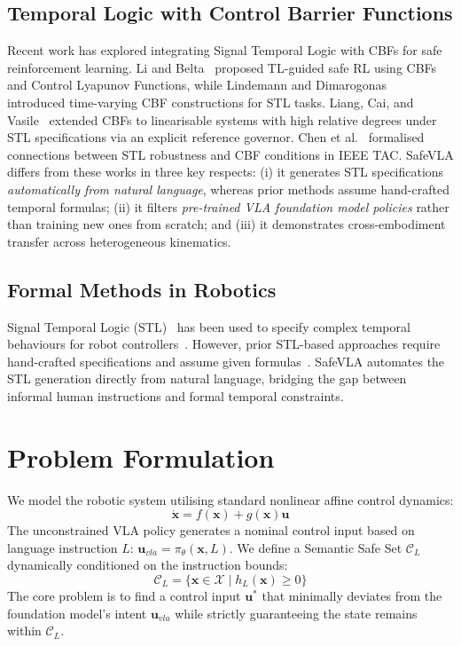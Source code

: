 \documentclass[conference]{IEEEtran}
\begin{document}
\subsection{Temporal Logic with Control Barrier Functions}
Recent work has explored integrating Signal Temporal Logic with CBFs for safe reinforcement learning. Li and Belta~\cite{li2022tl_cbf} proposed TL-guided safe RL using CBFs and Control Lyapunov Functions, while Lindemann and Dimarogonas~\cite{lindemann2018cbf_stl, lindemann2019cbf_stl_csl} introduced time-varying CBF constructions for STL tasks. Liang, Cai, and Vasile~\cite{liang2023erg_cbf_stl} extended CBFs to linearisable systems with high relative degrees under STL specifications via an explicit reference governor. Chen et al.~\cite{chen2025stl_cbf_tac} formalised connections between STL robustness and CBF conditions in IEEE TAC. SafeVLA differs from these works in three key respects: (i) it generates STL specifications \textit{automatically from natural language}, whereas prior methods assume hand-crafted temporal formulas; (ii) it filters \textit{pre-trained VLA foundation model policies} rather than training new ones from scratch; and (iii) it demonstrates cross-embodiment transfer across heterogeneous kinematics.
\subsection{Formal Methods in Robotics}
Signal Temporal Logic (STL)~\cite{maler2004stl} has been used to specify complex temporal behaviours for robot controllers~\cite{li2017stl_rl}. However, prior STL-based approaches require hand-crafted specifications and assume given formulas~\cite{lindemann2018cbf_stl, chen2025stl_cbf_tac}. SafeVLA automates the STL generation directly from natural language, bridging the gap between informal human instructions and formal temporal constraints.

\section{Problem Formulation}
We model the robotic system utilising standard nonlinear affine control dynamics:
\begin{equation}
\dot{\mathbf{x}} = f(\mathbf{x}) + g(\mathbf{x})\mathbf{u}
\end{equation}
The unconstrained VLA policy generates a nominal control input based on language instruction $L$: $\mathbf{u}_{vla} = \pi_{\theta}(\mathbf{x}, L)$. We define a Semantic Safe Set $\mathcal{C}_L$ dynamically conditioned on the instruction bounds:
\begin{equation}
\mathcal{C}_L = \{ \mathbf{x} \in \mathcal{X} \mid h_L(\mathbf{x}) \ge 0 \}
\end{equation}
The core problem is to find a control input $\mathbf{u}^*$ that minimally deviates from the foundation model's intent $\mathbf{u}_{vla}$ while strictly guaranteeing the state remains within $\mathcal{C}_L$.
\end{document}
